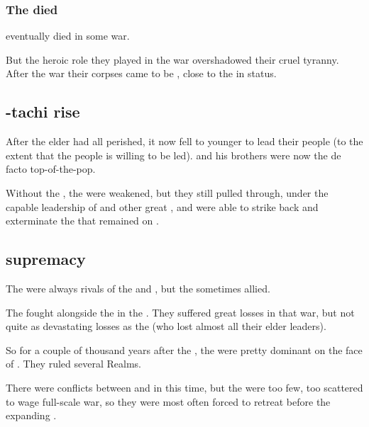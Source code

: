 \subsubsection{The \firstgendragons{} died}
\Tiamat{} eventually died in some war. 

But the heroic role they played in the war overshadowed their cruel tyranny. 
After the war their corpses came to be , close to the \xss{} in status. 










\subsection{\Nexagglachel-tachi rise}
After the elder \dragons{} had all perished, it now fell to younger \dragons{} to lead their people (to the extent that the \draconic{} people is willing to be led). 
\Nexagglachel{} and his brothers were now the de facto top-of-the-pop. 

Without the \firstgendragons, the \dragons{} were weakened, but they still pulled through, under the capable leadership of \Nexagglachel{} and other great \dragonlords, and were able to strike back and exterminate the \banes{} that remained on \Miith. 









\subsection{\QuilJaaran{} supremacy}
The \quiljaaran{} were always rivals of the \dragons{} and \ophidians, but the sometimes allied. 

The \quiljaaran{} fought alongside the \dragons{} in the \firstbanewar. 
They suffered great losses in that war, but not quite as devastating losses as the \dragons{} (who lost almost all their elder leaders). 

So for a couple of thousand years after the \firstbanewar, the \quiljaaran{} were pretty dominant on the face of \Miith{}. 
They ruled several Realms. 

There were conflicts between \quiljaaran{} and \dragons{} in this time, but the \dragons{} were too few, too scattered to wage full-scale war, so they were most often forced to retreat before the expanding \quiljaaran. 

